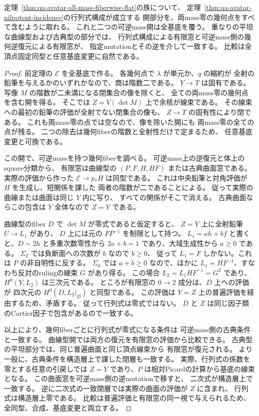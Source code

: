\begin{corollary}[massの型が変わる族における行列式表示]
\label{cor:qa-avatar-mass-crossing-incidence}
定理~\ref{thm:qa-avatar-all-mass-fiberwise-flat}の族について、
定理~\ref{thm:qa-avatar-nilpotent-incidence}の行列式構成が成立する
開部分を、両mass零の幾何点をすべて含むように取れる。
これと二つの可逆mass開は全基底を覆う。
重なりの平坦な曲線型および古典型の部分では、
行列式構成による有限窓と可逆mass側の幾何逆復元による有限窓が、
指定mutationとその逆を介して一致する。
比較は全頂点固定同型と任意基底変更に自然である。
\end{corollary}
\begin{proof}
前定理の $\mathcal E$ を全基底で作る。
各幾何点で $\lambda$ が単元か、$q$ の縮約が
全射の鉛筆を与えるかのいずれかなので、商は階数二である。
$Y\to T$ は固有である。
写像 $M$ の階数が二未満になる閉集合の像を除くと、
全ての両mass零の幾何点を含む開を得る。
そこでは $Z=V(\det M)$ 上で余核が線束である。
その線束への最初の鉛筆の評価が全射でない閉集合の像も、
$Z\to T$ の固有性により閉である。
これも両mass零の点では空なので、像を除いた開にも
両mass零の全ての点が残る。
二つの除去は幾何fiberの階数と全射性だけで定まるため、
任意基底変更と可換である。

この開で、可逆massを持つ幾何fiberを調べる。
可逆mass上の逆復元と体上のsquare分類から、
有限窓は曲線型の $(P,F,H,HF)$ または古典曲面窓である。
実際の評価から作った $\mathcal E\to p_*H$ は同型である。
これは中央鉛筆と対角評価が $H$ を生成し、短関係を課した
両者の階数が二であることによる。
従って実際の曲線または曲面は同じ $Y$ 内に写り、
すべての関係がそこで消える。
古典曲面ならこの包含は $Y$ 全体なので $Z=Y$ である。

曲線型のfiber $D$ で $\det M$ が零式であると仮定すると、
$Z=Y$ 上に全射鉛筆 $U\to L_1$ があり、
$D$ 上には元の $FP^{-1}$ を制限として持つ。
$L_1=ah+bf$ と書くと、$D\sim2h$ と多重次数零性から
$2a+b=1$ であり、大域生成性から $a\ge0$ である。
$\Sigma_2$ では負断面への次数が $b$ なので $b\ge0$、
従って $L_1=F$ しかない。これは $P$ の非自明性に反する。
$\Sigma_0$ では $a+b\ge0$ なので、ほかに
$L_1=HF^{-1}$、すなわち反対のrulingの線束 $G$ があり得る。
この場合 $L_2=L_1HF^{-1}=G^2$ であり、
$H^0(Y,L_2)$ は三次元である。
ところが有限窓の $0\to2$ 成分は、$D$ 上への評価が
四次元の $H^0(D,L_2|_D)$ と同型である。
この評価は $Y=Z$ 上の普遍評価を経由するため、矛盾する。
従って行列式は零式ではない。
$D$ と $Z$ は同じ因子類のCartier因子で包含があるので一致する。

以上により、幾何fiberごとに行列式が零式になる条件は
可逆mass側の古典条件と一致する。
曲線型開では両方の復元を有限窓の評価から比較できる。
古典型の平坦部分では、同じ普遍曲面と同じ頂点線束から
有限窓が復元される。
より一般に、古典条件を構造層上で課した閉層も一致する。
実際、行列式の係数を零とする任意の引戻しでは
$Z=Y$ であり、$P$ は相対Picardの計算から基底の線束となる。
この曲面窓を可逆mass側の逆mutationで移すと、
二次式が構造層上で一致する。
逆に二次式の一致閉層では実際の曲面の評価が $Z$ に含まれ、
行列式は構造層上零である。
比較は普遍評価と有限窓の同一視で与えられるため、
全同型、合成、基底変更と両立する。
\end{proof}


